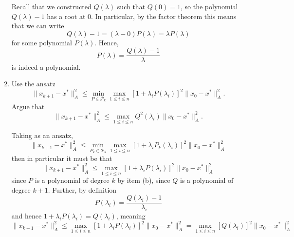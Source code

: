 \documentclass{../../../kin_math}
\begin{document}
\begin{questions}
\begin{enumerate}
    \begin{solution}
      Recall that we constructed $Q(\lambda)$ such that $Q(0) = 1$, so the polynomial $Q(\lambda) - 1$ has a root at $0$. In particular, by the factor theorem this means that we can write
      \begin{equation*}
        Q(\lambda) - 1 = (\lambda - 0) P(\lambda) = \lambda P(\lambda)
      \end{equation*}
      for some polynomial $P(\lambda)$. Hence,
      \begin{equation*}
        P(\lambda) = \frac{Q(\lambda) - 1}{\lambda}
      \end{equation*}
      is indeed a polynomial.
    \end{solution}
    \item Use the ansatz
    \begin{equation}
      \lVert x_{k + 1} - x^* \rVert_A^2 \leq \min_{P \in \mathcal{P}_k} \max_{1 \leq i \leq n} [1 + \lambda_i P(\lambda_i)]^2 \lVert x_0 - x^* \rVert_A^2.
    \end{equation}
    Argue that
    \begin{equation}
      \lVert x_{k + 1} - x^* \rVert_A^2 \leq \max_{1 \leq i \leq n} Q^2(\lambda_i) \lVert x_0 - x^* \rVert_A^2.
    \end{equation}
    \begin{solution}
      Taking as an ansatz,
      \begin{equation*}
        \lVert x_{k + 1} - x^* \rVert_A^2 \leq \min_{P_k \in \mathcal{P}_k} \max_{1 \leq i \leq n} [1 + \lambda_i P_k(\lambda_i)]^2 \lVert x_0 - x^* \rVert_A^2
      \end{equation*}
      then in particular it must be that
      \begin{equation*}
        \lVert x_{k + 1} - x^* \rVert_A^2 \leq \max_{1 \leq i \leq n} [1 + \lambda_i P(\lambda_i)]^2 \lVert x_0 - x^* \rVert_A^2
      \end{equation*}
      since $P$ is a polynomial of degree $k$ by item (b), since $Q$ is a polynomial of degree $k + 1$. Further, by definition
      \begin{equation*}
        P(\lambda_i) = \frac{Q(\lambda_i) - 1}{\lambda_i}
      \end{equation*}
      and hence $1 + \lambda_i P(\lambda_i) = Q(\lambda_i)$, meaning
      \begin{equation*}
        \lVert x_{k + 1} - x^* \rVert_A^2 \leq \max_{1 \leq i \leq n} [1 + \lambda_i P(\lambda_i)]^2 \lVert x_0 - x^* \rVert_A^2 = \max_{1 \leq i \leq n} [Q(\lambda_i)]^2 \lVert x_0 - x^* \rVert_A^2

\end{equation*}
\end{solution}
\end{enumerate}
\end{questions}
\end{document}
